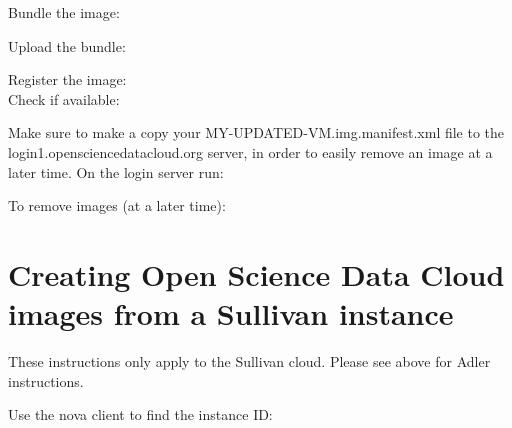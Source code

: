 \documentclass[letterpaper,10pt,english]{sphinxmanual}
\begin{document}
Bundle the image:
\begin{quote}

\end{quote}

Upload the bundle:
\begin{quote}

\end{quote}
\begin{description}
\item[{Register the image:}] \leavevmode
{}

\item[{Check if available:}] \leavevmode
{}

\end{description}

Make sure to make a copy your MY-UPDATED-VM.img.manifest.xml file to the login1.opensciencedatacloud.org server, in order to easily remove an image at a later time. On the login server run:
\begin{quote}

\end{quote}

To remove images (at a later time):
\begin{quote}


\end{quote}


\section{Creating Open Science Data Cloud images from a Sullivan instance}
\label{basicusage:creating-open-science-data-cloud-images-from-a-sullivan-instance}
These instructions only apply to the Sullivan cloud. Please see above for Adler instructions.

Use the nova client to find the instance ID:
\begin{quote}

\end{quote}
\end{document}

